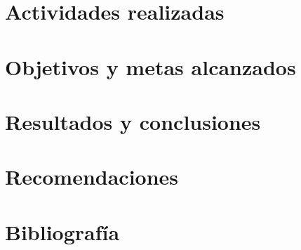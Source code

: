 \documentclass[letterpaper,11pt,twoside]{report}
\begin{document}
	\section{Actividades realizadas}

	\section{Objetivos y metas alcanzados}

	\section{Resultados y conclusiones}

	\section{Recomendaciones}

	\section{Bibliograf\'ia}
\end{document}
